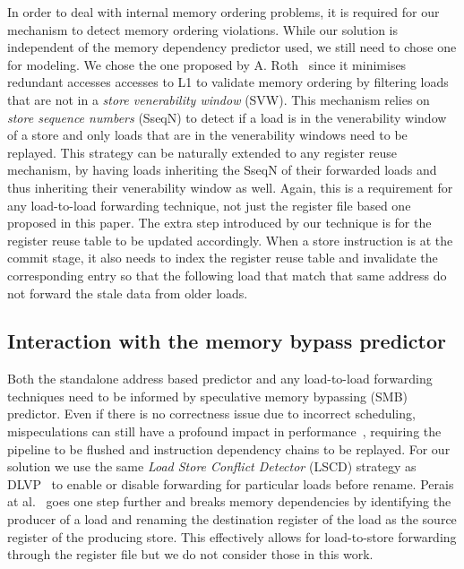 \documentclass{sig-alternate}
\begin{document}
In order to deal with internal memory ordering problems, it is required for our mechanism to detect memory ordering violations. While our solution is independent of the memory dependency predictor used, we still need to chose one for modeling. We chose the one proposed by A. Roth~\cite{} since it minimises redundant accesses accesses to L1 to validate memory ordering by filtering loads that are not in a \textit{store venerability window} (SVW). This mechanism relies on \textit{store sequence numbers} (SseqN) to detect if a load is in the venerability window of a store and only loads that are in the venerability windows need to be replayed. This strategy can be naturally extended to any register reuse mechanism, by having loads inheriting the SseqN of their forwarded loads and thus inheriting their venerability window as well. %
Again, this is a requirement for any load-to-load forwarding technique, not just the register file based one proposed in this paper. The extra step introduced by our technique is for the register reuse table to be updated accordingly. When a store instruction is at the commit stage, it also needs to index the register reuse table and invalidate the corresponding entry so that the following load that match that same address do not forward the stale data from older loads.



\subsection{Interaction with the memory bypass predictor}
Both the standalone address based predictor and any load-to-load forwarding techniques need to be informed by speculative memory bypassing (SMB) predictor. Even if there is no correctness issue due to incorrect scheduling, mispeculations can still have a profound impact in performance~\cite{}, requiring the pipeline to be flushed and instruction dependency chains to be replayed. For our solution we use the same \textit{Load Store Conflict Detector} (LSCD) strategy as DLVP~\cite{} to enable or disable forwarding for particular loads before rename. Perais at al.~\cite{} goes one step further and breaks memory dependencies by identifying the producer of a load and renaming the destination register of the load as the source register of the producing store. This effectively allows for load-to-store forwarding through the register file but we do not consider those in this work.  
\end{document}
